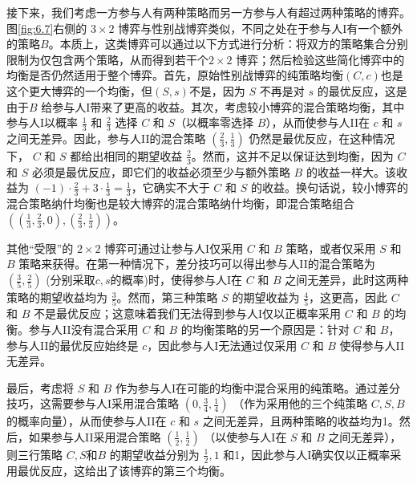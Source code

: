 接下来，我们考虑一方参与人有两种策略而另一方参与人有超过两种策略的博弈。图\ref{fig:6.7}右侧的 \(3 \times  2\) 博弈与性别战博弈类似，不同之处在于参与人I有一个额外的策略$B$。本质上，这类博弈可以通过以下方式进行分析：将双方的策略集合分别限制为仅包含两个策略，从而得到若干个\(2 \times  2\) 博弈；然后检验这些简化博弈中的均衡是否仍然适用于整个博弈。首先，原始性别战博弈的纯策略均衡$(C, c)$也是这个更大博弈的一个均衡，但$(S, s)$不是，因为 \(S\) 不再是对 \(s\) 的最优反应，这是由于\(B\) 给参与人I带来了更高的收益。其次，考虑较小博弈的混合策略均衡，其中参与人I以概率 \(\frac{1}{3}\) 和 \(\frac{2}{3}\) 选择 \(C\) 和 \(S\)（以概率零选择 \(B\)），从而使参与人II在 \(c\) 和 \(s\) 之间无差异。因此，参与人II的混合策略 \(\left( {\frac{2}{3},\frac{1}{3}}\right)\) 仍然是最优反应，在这种情况下， \(C\) 和 \(S\) 都给出相同的期望收益 \(\frac{2}{3}\)。然而，这并不足以保证达到均衡，因为 \(C\) 和 \(S\) 必须是最优反应，即它们的收益必须至少与额外策略 \(B\) 的收益一样大。该收益为 \(\left( {-1}\right)  \cdot  \frac{2}{3} + 3 \cdot  \frac{1}{3} = \frac{1}{3}\)，它确实不大于 \(C\) 和 \(S\) 的收益。换句话说，较小博弈的混合策略纳什均衡也是较大博弈的混合策略纳什均衡，即混合策略组合 \(\left( {\left( {\frac{1}{3},\frac{2}{3},0}\right), \left( {\frac{2}{3},\frac{1}{3}}\right) }\right)\)。

其他“受限”的 \(2 \times  2\) 博弈可通过让参与人I仅采用 \(C\) 和 \(B\) 策略，或者仅采用 \(S\) 和 \(B\) 策略来获得。在第一种情况下，差分技巧可以得出参与人II的混合策略为 \(\left( {\frac{3}{5},\frac{2}{5}}\right)\) (分别采取\(c,s\)的概率)时，使得参与人I在 \(C\) 和 \(B\) 之间无差异，此时这两种策略的期望收益均为 \(\frac{3}{5}\)。然而，第三种策略 \(S\) 的期望收益为 \(\frac{4}{5}\)，这更高，因此 \(C\) 和 \(B\) 不是最优反应；这意味着我们无法得到参与人I仅以正概率采用 \(C\) 和 \(B\) 的均衡。参与人II没有混合采用 \(C\) 和 \(B\) 的均衡策略的另一个原因是：针对 \(C\) 和 \(B\)，参与人II的最优反应始终是 \(c\)，因此参与人I无法通过仅采用 \(C\) 和 \(B\) 使得参与人II无差异。

最后，考虑将 \(S\) 和 \(B\) 作为参与人I在可能的均衡中混合采用的纯策略。通过差分技巧，这需要参与人I采用混合策略 \(\left( {0,\frac{3}{4},\frac{1}{4}}\right)\) （作为采用他的三个纯策略 \(C,S,B\) 的概率向量），从而使参与人II在 \(c\) 和 \(s\) 之间无差异，且两种策略的收益均为1。然后，如果参与人II采用混合策略 \(\left( {\frac{1}{2},\frac{1}{2}}\right)\) （以使参与人I在 \(S\) 和 \(B\) 之间无差异），则三行策略 \(C,S\)和\(B\) 的期望收益分别为 \(\frac{1}{2},1\) 和1，因此参与人I确实仅以正概率采用最优反应，这给出了该博弈的第三个均衡。

